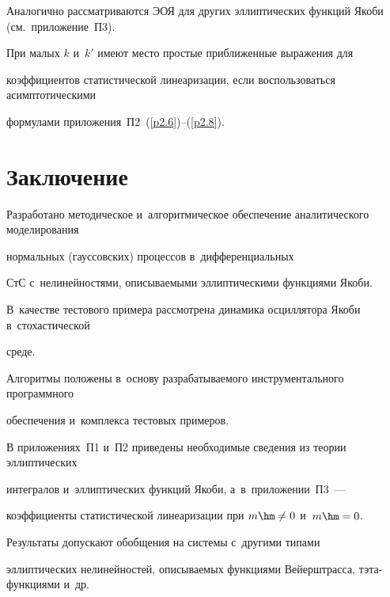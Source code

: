 




Аналогично рассматриваются ЭОЯ для других эллиптических функций Якоби (см.\ приложение~П3).



При малых $k$ и~$k'$ имеют место простые приближенные выражения для 

коэффициентов статистической линеаризации, если воспользоваться асимптотическими 

формулами приложения~П2~(\ref{p2.6})--(\ref{p2.8}).



\section{Заключение}



Разработано методическое и~алгоритмическое обеспечение аналитического моделирования 

нормальных (гауссовских) процессов в~дифференциальных 

СтС с~нелинейностями, описываемыми эл\-лип\-ти\-че\-ски\-ми функциями Якоби. 

В~качестве тестового примера рассмотрена динамика осциллятора Якоби в~стохастической 

среде.

Алгоритмы положены в~основу разрабатываемого инструментального программного 

обеспечения и~комплекса тестовых примеров.





В приложениях~П1 и~П2 приведены необходимые сведения из теории эл\-лип\-ти\-че\-ских 

интегралов и~эллиптических функций Якоби, а~в~приложении~П3~--- 

коэффициенты статистической линеаризации при $m\hm\ne 0$ и~$m\hm=0$.



Результаты допускают обобщения на системы с~другими типами 

эллиптических нелинейностей, описываемых функциями Вейерштрасса, тэта-функ\-ци\-ями и~др.



